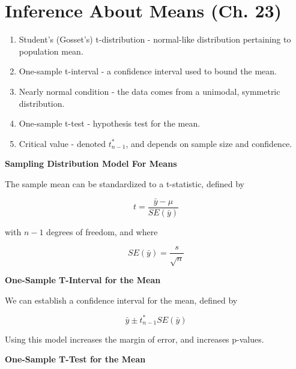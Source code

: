 \documentclass{article}
\theoremstyle{definition}
\begin{document}
\pagebreak

\section{Inference About Means (Ch. 23)}

\begin{enumerate}[label=\textbf{\roman*.}]
    \item Student's (Gosset's) t-distribution - normal-like distribution pertaining to population mean.

    \item One-sample t-interval - a confidence interval used to bound the mean.

    \item Nearly normal condition - the data comes from a unimodal, symmetric distribution.

    \item One-sample t-test - hypothesis test for the mean.

    \item Critical value - denoted $t_{n-1}^*$, and depends on sample size and confidence.

\end{enumerate}

\vspace{2ex}
\textbf{Sampling Distribution Model For Means}

The sample mean can be standardized to a t-statistic, defined by

\begin{equation}
    t = \frac{\bar{y} - \mu}{SE(\bar{y})}
\end{equation}

with $n-1$ degrees of freedom, and where

\begin{equation}
    SE(\bar{y}) = \frac{s}{\sqrt{n}}
\end{equation}

\vspace{2ex}
\textbf{One-Sample T-Interval for the Mean}

We can establish a confidence interval for the mean, defined by

\begin{equation}
    \bar{y} \pm t^*_{n-1} SE(\bar{y})
\end{equation}

Using this model increases the margin of error, and increases p-values.

\vspace{2ex}
\textbf{One-Sample T-Test for the Mean}
\end{document}
